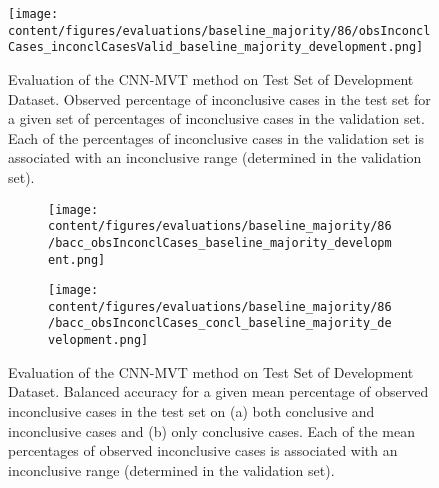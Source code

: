 \begin{figure}[h]
  \centering
  \texttt{[image: content/figures/evaluations/baseline\_majority/86/obsInconclCases\_inconclCasesValid\_baseline\_majority\_development.png]}
  \caption{Evaluation of the CNN-MVT method on Test Set of Development Dataset.
  Observed percentage of inconclusive cases in the test set 
  for a given set of percentages of inconclusive cases in the validation set.
  Each of the percentages of inconclusive cases in the validation set is associated 
  with an inconclusive range (determined in the validation set).} 
  \label{fig:obsInconclCases_inconclCasesValid_baseline_majority_development}
\end{figure} 


\begin{figure}[t]
  \begin{subfigure}{0.9\textwidth}
    \centering
    \texttt{[image: content/figures/evaluations/baseline\_majority/86/bacc\_obsInconclCases\_baseline\_majority\_development.png]}
    \subcaption{}
    \label{fig:bacc_obsInconclCases_baseline_majority_development}
  \end{subfigure}
  \hfill
  \begin{subfigure}{0.9\textwidth}
    \centering
    \texttt{[image: content/figures/evaluations/baseline\_majority/86/bacc\_obsInconclCases\_concl\_baseline\_majority\_development.png]}
    \subcaption{}
    \label{fig:bacc_obsInconclCases_concl_baseline_majority_development}
  \end{subfigure}

  \caption{Evaluation of the CNN-MVT method on Test Set of Development Dataset.
  Balanced accuracy for a given mean percentage of observed inconclusive cases in the test set on 
  (a) both conclusive and inconclusive cases and (b) only conclusive cases. 
  Each of the mean percentages of observed inconclusive cases is associated with an inconclusive range (determined in the validation set). }
  \label{fig:bacc_obsInconclCases_baseline_majority_development_full}
\end{figure}




